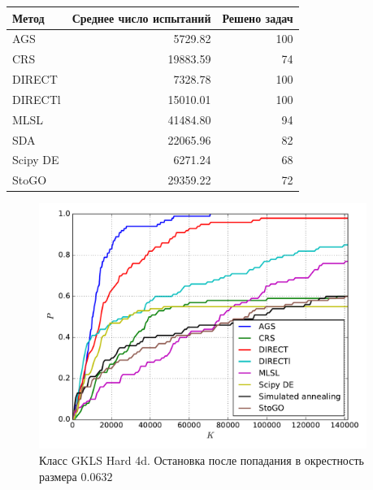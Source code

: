 \documentclass[a4paper]{article}
\begin{document}
\begin{tabular}{lrr}
\hline
 Метод    &   Среднее число испытаний &   Решено задач \\
\hline
 AGS      &                   5729.82 &            100 \\
 CRS      &                  19883.59 &             74 \\
 DIRECT   &                   7328.78 &            100 \\
 DIRECTl  &                  15010.01 &            100 \\
 MLSL     &                  41484.80 &             94 \\
 SDA      &                  22065.96 &             82 \\
 Scipy DE &                   6271.24 &             68 \\
 StoGO    &                  29359.22 &             72 \\
\hline
\end{tabular}
\begin{figure}[H]
  \center
  \includegraphics[width=0.95\textwidth]{../experiments/gklsh4d_serg/cmc.pdf}
  \caption{Класс GKLS Hard 4d. Остановка после попадания в окрестность размера $0.0632$}
  \label{fig:}
\end{figure}
\end{document}
